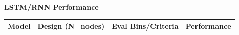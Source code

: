 \documentclass[final]{beamer}
\newlength{\colwidth}
\begin{document}
\begin{frame}[t]
\begin{columns}[t]
\begin{column}{\colwidth}
\begin{block}
        {
          \fontsize{37pt}{44.4pt} \selectfont {}}


      \begin{figure}
      \end{figure}
      \large{\textbf{LSTM/RNN Performance}}\vspace*{-\baselineskip}
        \large{
          \begin{table}
            \centering
            \begin{tabular}{l l l l}
              \toprule
              \multicolumn{1}{|l|}{\textbf{Model}}                                                                                                         & \multicolumn{1}{|l|}{\textbf{Design (N=nodes)}} & \multicolumn{1}{|l|}{\textbf{Eval Bins/Criteria}} & \multicolumn{1}{|l|}{\textbf{Performance}} \\
              \midrule


\end{tabular}
\end{table}}
\end{block}
\end{column}
\end{columns}
\end{frame}
\end{document}

